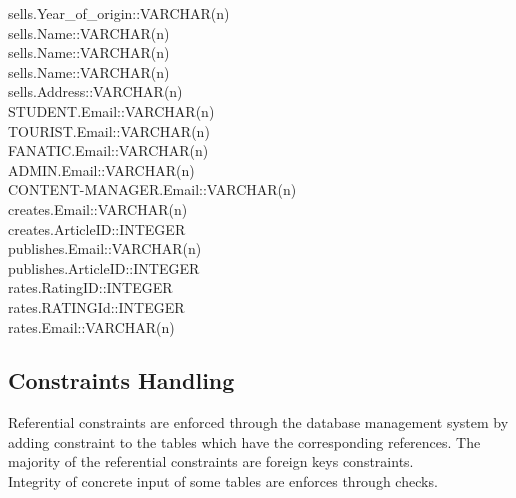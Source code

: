 sells.Year\_of\_origin::VARCHAR(n)\\
sells.Name::VARCHAR(n)\\
sells.Name::VARCHAR(n)\\
sells.Name::VARCHAR(n)\\
sells.Address::VARCHAR(n)\\
STUDENT.Email::VARCHAR(n)\\
TOURIST.Email::VARCHAR(n)\\
FANATIC.Email::VARCHAR(n)\\
ADMIN.Email::VARCHAR(n)\\
CONTENT-MANAGER.Email::VARCHAR(n)\\
creates.Email::VARCHAR(n)\\
creates.ArticleID::INTEGER\\
publishes.Email::VARCHAR(n)\\
publishes.ArticleID::INTEGER\\
rates.RatingID::INTEGER\\
rates.RATINGId::INTEGER\\
rates.Email::VARCHAR(n)\\

\subsection{Constraints Handling}
Referential constraints are enforced through the database management system by adding constraint to the tables which have the corresponding references. The majority of the referential constraints are foreign keys constraints.\\  Integrity of concrete input of some tables are enforces through checks.\\
\newpage